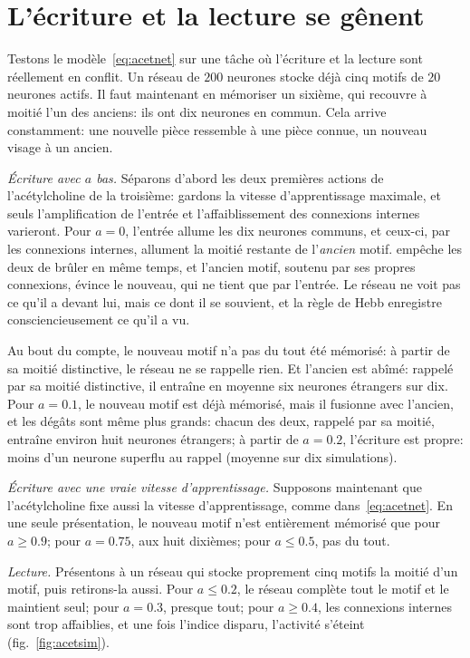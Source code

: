 \section{L'écriture et la lecture se gênent}

Testons le modèle~\eqref{eq:acetnet} sur une tâche où l'écriture et la lecture sont réellement en conflit. Un réseau de $200$ neurones stocke déjà cinq motifs de $20$ neurones actifs. Il faut maintenant en mémoriser un sixième, qui recouvre à moitié l'un des anciens: ils ont dix neurones en commun. Cela arrive constamment: une nouvelle pièce ressemble à une pièce connue, un nouveau visage à un ancien.

\emph{Écriture avec $a$ bas.} Séparons d'abord les deux premières actions de l'acétylcholine de la troisième: gardons la vitesse d'apprentissage maximale, et seuls l'amplification de l'entrée et l'affaiblissement des connexions internes varieront. Pour $a=0$, l'entrée allume les dix neurones communs, et ceux-ci, par les connexions internes, allument la moitié restante de l'\emph{ancien} motif.  empêche les deux de brûler en même temps, et l'ancien motif, soutenu par ses propres connexions, évince le nouveau, qui ne tient que par l'entrée. Le réseau ne voit pas ce qu'il a devant lui, mais ce dont il se souvient, et la règle de Hebb enregistre consciencieusement ce qu'il a vu.

Au bout du compte, le nouveau motif n'a pas du tout été mémorisé: à partir de sa moitié distinctive, le réseau ne se rappelle rien. Et l'ancien est abîmé: rappelé par sa moitié distinctive, il entraîne en moyenne six neurones étrangers sur dix. Pour $a=0.1$, le nouveau motif est déjà mémorisé, mais il fusionne avec l'ancien, et les dégâts sont même plus grands: chacun des deux, rappelé par sa moitié, entraîne environ huit neurones étrangers; à partir de $a=0.2$, l'écriture est propre: moins d'un neurone superflu au rappel (moyenne sur dix simulations).

\emph{Écriture avec une vraie vitesse d'apprentissage.} Supposons maintenant que l'acétylcholine fixe aussi la vitesse d'apprentissage, comme dans~\eqref{eq:acetnet}. En une seule présentation, le nouveau motif n'est entièrement mémorisé que pour $a\ge0.9$; pour $a=0.75$, aux huit dixièmes; pour $a\le0.5$, pas du tout.

\emph{Lecture.} Présentons à un réseau qui stocke proprement cinq motifs la moitié d'un motif, puis retirons-la aussi. Pour $a\le0.2$, le réseau complète tout le motif et le maintient seul; pour $a=0.3$, presque tout; pour $a\ge0.4$, les connexions internes sont trop affaiblies, et une fois l'indice disparu, l'activité s'éteint (fig.~\ref{fig:acetsim}).

